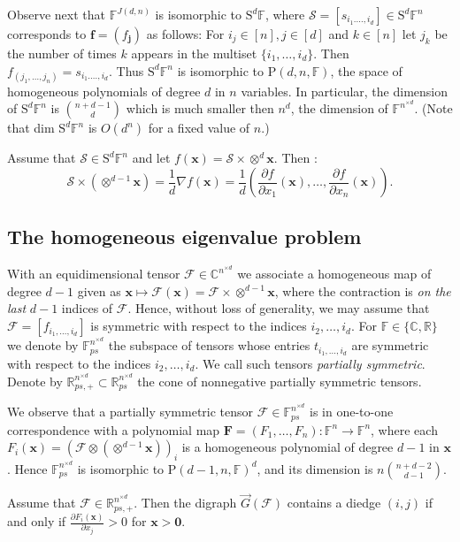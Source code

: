 \documentclass{amsart}
\newcommand{\digraph}{\vec{G}}
\newcommand{\C}{\mathbb{C}}
\newcommand{\F}{\mathbb{F}}
\newcommand{\R}{\mathbb{R}}
\newcommand{\f}{\mathbf{f}}
\newcommand{\bF}{\mathbf{F}}
\newcommand{\x}{\mathbf{x}}
\newcommand{\0}{\mathbf{0}}
\newcommand{\1}{\mathbf{1}}
\newcommand{\bj}{\mathbf{j}}
\newcommand{\cF}{\mathcal{F}}
\newcommand{\cS}{\mathcal{S}}
\newcommand{\rP}{\mathrm{P}}
\newcommand{\rS}{\mathrm{S}}
\theoremstyle{remark}
\numberwithin{equation}{section} %
\begin{document}
Observe next that $\F^{J(d,n)}$ is isomorphic to $\rS^d\F$, where $\cS=[s_{i_1.\ldots,i_d}]\in \rS^d\F^n$ corresponds to $\f=(f_{\bj})$ as follows:  For $i_j\in[n],j\in [d]$ and $k\in[n]$ let $j_k$ be the number of times $k$ appears in the multiset $\{i_1,\ldots,i_d\}$.  Then $f_{(j_1,\ldots,j_n)}=s_{i_1.\ldots,i_d}$.  Thus $\rS^d\F^n$ is isomorphic to $\rP(d,n,\F)$, the space of homogeneous  polynomials of degree $d$ in $n$ variables.  In particular, the dimension of $\rS^d\F^n$ is $n+d-1\choose d$ which is much smaller then $n^d$, the dimension of $\F^{n^{\times d}}$.  (Note that dim $\rS^d\F^n$ is $O(d^n)$ for a fixed value of $n$.)  

Assume that $\cS\in\rS^d\F^n$ and let $f(\x)=\cS\times\otimes^d\x$.  Then \cite{FW16}:
\[\cS\times(\otimes^{d-1}\x)=\frac{1}{d}\nabla f(\x)=\frac{1}{d}(\frac{\partial f}{\partial x_1}(\x),\ldots,\frac{\partial f}{\partial x_n}(\x)).\]



\subsection{The homogeneous eigenvalue problem}\label{subsec:homeigv}
 With an equidimensional tensor $\cF\in \C^{n^{\times d}}$ we associate a homogeneous map of degree $d-1$
 given as $\x\mapsto\cF(\x)=\cF\times \otimes^{d-1}\x$, where the contraction is \emph{on the last}
 $d-1$ indices of $\cF$.  Hence, without loss of generality, we may assume that $\cF=[f_{i_1,\ldots,i_d}]$ is symmetric with respect to
the indices $i_2,\ldots,i_d$.  For $\F\in\{\C,\R\}$ we denote by $\F^{n^{\times d}}_{ps}$ the subspace of tensors whose entries $t_{i_1,\ldots,i_d}$ are symmetric with respect to the indices $i_2,\ldots,i_d$.  We call such tensors \emph{partially symmetric}.  
Denote by $\R_{ps,+}^{n^{\times d}}\subset \R_{ps}^{n^{\times d}}$ the cone of  nonnegative partially symmetric tensors.

We observe that a partially symmetric tensor $\cF\in\F^{n^{\times d}}_{ps}$ is in one-to-one correspondence with a polynomial map $\bF=(F_1,\ldots,F_n):\F^n\to\F^n$, where each $F_i(\x)=(\cF\otimes (\otimes^{d-1}\x))_i$ is a homogeneous polynomial of degree $d-1$ in $\x$.  Hence $\F^{n^{\times d}}_{ps}$ is isomorphic to $\rP(d-1,n,\F)^d$, and its dimension is $n{n+d-2\choose d-1}$.

%

Assume that $\cF\in\R_{ps,+}^{n^{\times d}}$.  Then the digraph  $\digraph(\cF)$ contains a diedge $(i,j)$ if and only if $\frac{\partial F_i(\x)}{\partial x_j}> 0$ for $\x>\0$. 
\end{document}
